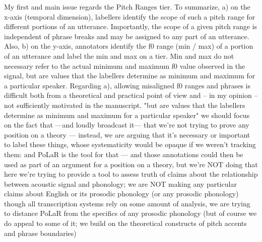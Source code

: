 \markdownRendererUlEndTight \markdownRendererUlItemEnd 
\markdownRendererUlEndTight \markdownRendererInterblockSeparator
{}
\markdownRendererSectionEnd \markdownRendererSectionBegin
{}\markdownRendererInterblockSeparator
{}\markdownRendererUlBeginTight
\markdownRendererUlItem My first and main issue regards the Pitch Ranges tier. To summarize, a) on the x-axis (temporal dimension), labellers identify the scope of such a pitch range for different portions of an utterance. Importantly, the scope of a given pitch range is independent of phrase breaks and may be assigned to any part of an utterance. Also, b) on the y-axis, annotators identify the f0 range (min / max) of a portion of an utterance and label the min and max on a tier. Min and max do not necessary refer to the actual minimum and maximum f0 value observed in the signal, but are values that the labellers determine as minimum and maximum for a particular speaker. Regarding a), allowing misaligned f0 ranges and phrases is difficult both from a theoretical and practical point of view and – in my opinion – not sufficiently motivated in the manuscript.\markdownRendererUlItemEnd 
\markdownRendererUlItem "but are values that the labellers determine as minimum and maximum for a particular speaker"\markdownRendererInterblockSeparator
{}\markdownRendererUlBeginTight
\markdownRendererUlItem we should focus on the fact that —and loudly broadcast it— that we're not trying to prove any position on a theory — instead, we are arguing that it's necessary or important to label these things, whose systematicity would be opaque if we weren't tracking them: and PoLaR is the tool for that — and those annotations could then be used as part of an argument for a position on a theory, but we're NOT doing that here\markdownRendererUlItemEnd 
\markdownRendererUlItem we’re trying to provide a tool to assess truth of claims about the relationship between acoustic signal and phonology; we are NOT making any particular claims about English or its prosodic phonology (or any prosodic phonology)\markdownRendererInterblockSeparator
{}\markdownRendererUlBeginTight
\markdownRendererUlItem though all transcription systems rely on some amount of analysis, we are trying to distance PoLaR from the specifics of any prosodic phonology\markdownRendererUlItemEnd 
\markdownRendererUlItem (but of course we do appeal to some of it; we build on the theoretical constructs of pitch accents and phrase boundaries)\markdownRendererUlItemEnd 
\markdownRendererUlEndTight \markdownRendererUlItemEnd 
